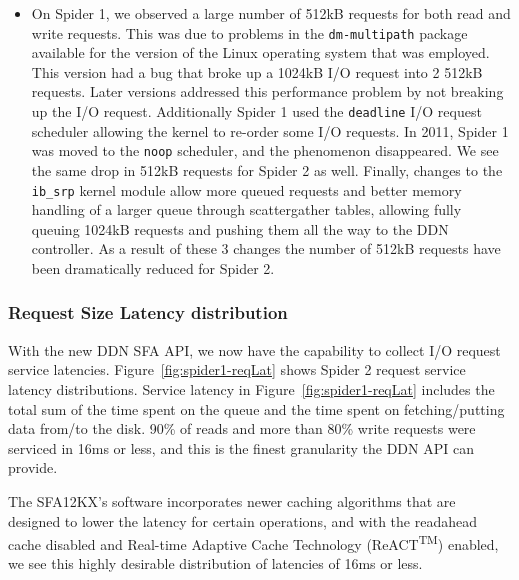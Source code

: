 \begin{itemize}
\item   On Spider 1, we observed a large number of 512kB requests for both read
and write requests. This was due to problems in the {\tt dm-multipath} \cite
{mpath}
package available for the version of the Linux operating system that
was employed. This version had a bug that broke up a 1024kB I/O request into 2
512kB requests. Later versions addressed this performance problem by not
breaking up the I/O request. Additionally Spider 1 used the {\tt deadline} I/O
request scheduler allowing the kernel to re-order some I/O
requests.  In 2011, Spider 1 was moved to the  {\tt noop} scheduler, and the
phenomenon disappeared. We see the same drop in 512kB requests for Spider 2 as
well. Finally, changes to the {\tt ib\_srp} kernel module allow more queued
requests
and better memory handling of a larger queue through scatter\/gather tables, 
allowing fully queuing 1024kB requests and pushing them all the way to the
DDN controller. As a result of these 3 changes the number of 512kB requests
have been dramatically reduced for Spider 2.  \end{itemize}

\subsubsection{Request Size Latency distribution}

With the new DDN SFA API, we now have the capability to collect I/O request
service latencies. Figure~\ref{fig:spider1-reqLat} shows Spider 2 request
service latency distributions. Service latency in Figure~\ref{fig:spider1-reqLat} 
includes the total sum of the time spent on the queue and the time spent on fetching/putting data from/to
the disk. 90\% of reads and more than 80\%
write requests were serviced in 16ms or less, and this is the finest granularity
the DDN API can provide. 

The SFA12KX's software incorporates newer caching algorithms that are designed
to lower the latency for certain operations, and with the readahead cache
disabled and Real-time Adaptive Cache Technology (ReACT\textsuperscript{TM})\cite{ReACT} 
enabled, we see this highly desirable distribution of latencies of 16ms or less.

